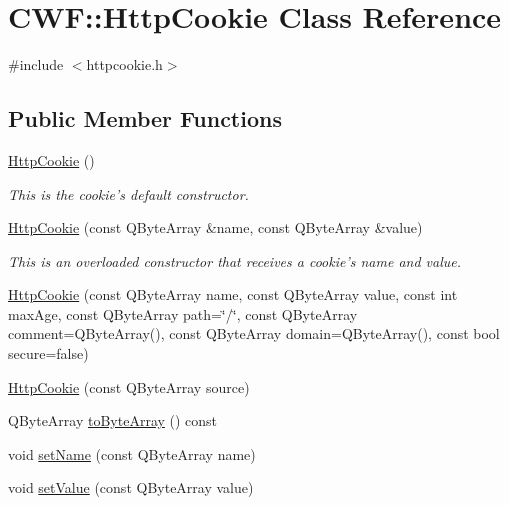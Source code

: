 \hypertarget{class_c_w_f_1_1_http_cookie}{\section{C\+W\+F\+:\+:Http\+Cookie Class Reference}
\label{class_c_w_f_1_1_http_cookie}
}


{\ttfamily \#include $<$httpcookie.\+h$>$}

\subsection*{Public Member Functions}
\begin{DoxyCompactItemize}
\item 
\hyperlink{class_c_w_f_1_1_http_cookie_a8d52ec650d065ef3a9b25d9a52d51f5d}{Http\+Cookie} ()
\begin{DoxyCompactList}\small\item\em This is the cookie's default constructor. \end{DoxyCompactList}\item 
\hyperlink{class_c_w_f_1_1_http_cookie_a2429ad80884ddb6712a9f1fa98e03eac}{Http\+Cookie} (const Q\+Byte\+Array \&name, const Q\+Byte\+Array \&value)
\begin{DoxyCompactList}\small\item\em This is an overloaded constructor that receives a cookie's name and value. \end{DoxyCompactList}\item 
\hyperlink{class_c_w_f_1_1_http_cookie_a062ac937c590c64cd705face36607cf7}{Http\+Cookie} (const Q\+Byte\+Array name, const Q\+Byte\+Array value, const int max\+Age, const Q\+Byte\+Array path=\char`\"{}/\char`\"{}, const Q\+Byte\+Array comment=Q\+Byte\+Array(), const Q\+Byte\+Array domain=Q\+Byte\+Array(), const bool secure=false)
\item 
\hyperlink{class_c_w_f_1_1_http_cookie_aaad501280c779b4601d1de1fc6e78d4e}{Http\+Cookie} (const Q\+Byte\+Array source)
\item 
Q\+Byte\+Array \hyperlink{class_c_w_f_1_1_http_cookie_a84c6628ab6c1955fe784bfbe6e66ca7e}{to\+Byte\+Array} () const 
\item 
void \hyperlink{class_c_w_f_1_1_http_cookie_aa64b038ecab5e9d1af27b81e3d32181c}{set\+Name} (const Q\+Byte\+Array name)
\item 
void \hyperlink{class_c_w_f_1_1_http_cookie_a5a72869d830416e2cf4ad88fc8594c50}{set\+Value} (const Q\+Byte\+Array value)
\item 

\end{DoxyCompactItemize}
